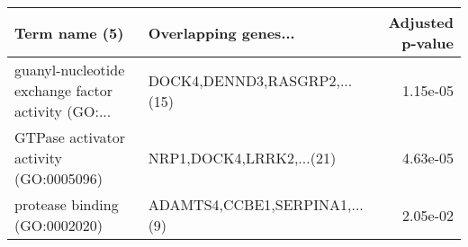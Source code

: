 \begin{tabular}{llr}
\toprule
                                     Term name (5) &          Overlapping genes... &  Adjusted p-value \\
\midrule
guanyl-nucleotide exchange factor activity (GO:... &  DOCK4,DENND3,RASGRP2,...(15) &          1.15e-05 \\
            GTPase activator activity (GO:0005096) &      NRP1,DOCK4,LRRK2,...(21) &          4.63e-05 \\
                     protease binding (GO:0002020) & ADAMTS4,CCBE1,SERPINA1,...(9) &          2.05e-02 \\
\bottomrule
\end{tabular}
